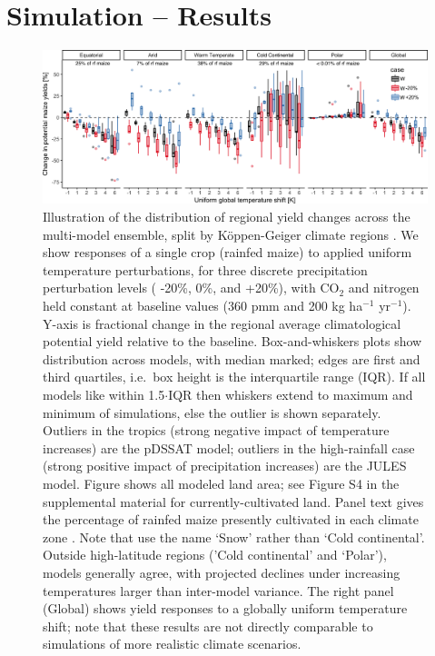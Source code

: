\documentclass[esd, manuscript]{copernicus} %
\begin{document}
\section{Simulation -- Results}
\label{S:3}
\begin{figure}[ht]
\centering
   \includegraphics[width=14cm]{figures/global_sim_CG.png}
   \caption{Illustration of the distribution of regional yield changes across the multi-model ensemble, split by K\"{o}ppen-Geiger climate regions \citep{rubel2010}. We show responses of a single crop (rainfed maize) to applied uniform temperature perturbations, for three discrete precipitation perturbation levels ( -20\%, 0\%, and +20\%), with CO$_2$ and nitrogen held constant at baseline values (360 pmm and 200 kg ha$^{-1}$ yr$^{-1}$). Y-axis is fractional change in the regional average climatological potential yield relative to the baseline. Box-and-whiskers plots show distribution across models, with median marked; edges are first and third quartiles, i.e.\ box height is the interquartile range (IQR). If all models like within 1.5$\cdot$IQR then whiskers extend to maximum and minimum of simulations, else the outlier is shown separately. Outliers in the tropics (strong negative impact of temperature increases) are the pDSSAT model; outliers in the high-rainfall case (strong positive impact of precipitation increases) are the JULES model. Figure shows all modeled land area; see Figure S4 in the supplemental material for currently-cultivated land. Panel text gives the percentage of rainfed maize presently cultivated in each climate zone \citep[data from][]{Portmann2010}. Note that \citet{rubel2010} use the name `Snow' rather than `Cold continental'. Outside high-latitude regions ('Cold continental' and `Polar'), models generally agree, with projected declines under increasing temperatures larger than inter-model variance. The right panel (Global) shows yield responses to a globally uniform temperature shift; note that these results are not directly comparable to simulations of more realistic climate scenarios.}
   \label{fig:globesim}
\end{figure}
\end{document}
